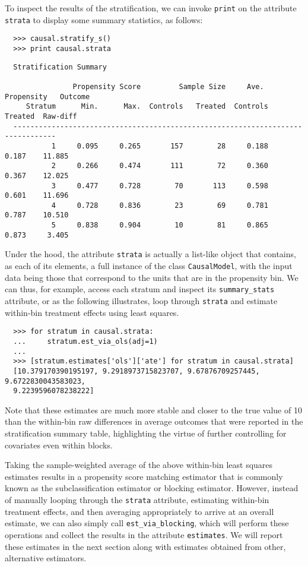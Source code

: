 \documentclass[12pt]{article}
\theoremstyle{definition}
\theoremstyle{definition}
\theoremstyle{definition}
\theoremstyle{remark}
\begin{document}
To inspect the results of the stratification, we can invoke \texttt{print} on the attribute \texttt{strata} to display some summary statistics, as follows:
\begin{verbatim}
  >>> causal.stratify_s()
  >>> print causal.strata
\end{verbatim}
\begin{verbatim}
  Stratification Summary
  
                Propensity Score         Sample Size     Ave. Propensity   Outcome
     Stratum      Min.      Max.  Controls   Treated  Controls   Treated  Raw-diff
  --------------------------------------------------------------------------------
           1     0.095     0.265       157        28     0.188     0.187    11.885
           2     0.266     0.474       111        72     0.360     0.367    12.025
           3     0.477     0.728        70       113     0.598     0.601    11.696
           4     0.728     0.836        23        69     0.781     0.787    10.510
           5     0.838     0.904        10        81     0.865     0.873     3.405
\end{verbatim}

Under the hood, the attribute \texttt{strata} is actually a list-like object that contains, as each of its elements, a full instance of the class \texttt{CausalModel}, with the input data being those that correspond to the units that are in the propensity bin. We can thus, for example, access each stratum and inspect its \texttt{summary\_stats} attribute, or as the following illustrates, loop through \texttt{strata} and estimate within-bin treatment effects using least squares.
\begin{verbatim}
  >>> for stratum in causal.strata:
  ...     stratum.est_via_ols(adj=1)
  ... 
  >>> [stratum.estimates['ols']['ate'] for stratum in causal.strata]
  [10.379170390195197, 9.2918973715823707, 9.67876709257445, 9.6722830043583023,
  9.2239596078238222]
\end{verbatim}

Note that these estimates are much more stable and closer to the true value of 10 than the within-bin raw differences in average outcomes that were reported in the stratification summary table, highlighting the virtue of further controlling for covariates even within blocks.

Taking the sample-weighted average of the above within-bin least squares estimates results in a propensity score matching estimator that is commonly known as the subclassification estimator or blocking estimator. However, instead of manually looping through the \texttt{strata} attribute, estimating within-bin treatment effects, and then averaging appropriately to arrive at an overall estimate, we can also simply call \texttt{est\_via\_blocking}, which will perform these operations and collect the results in the attribute \texttt{estimates}. We will report these estimates in the next section along with estimates obtained from other, alternative estimators.
\end{document}
